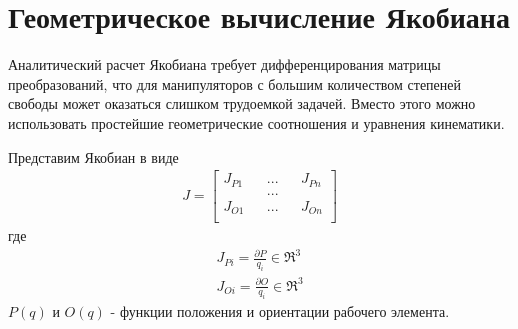 \section{Геометрическое вычисление Якобиана}\label{sect:4_8}
Аналитический расчет Якобиана требует дифференцирования матрицы преобразований, что для манипуляторов с большим количеством степеней свободы может оказаться слишком трудоемкой задачей. Вместо этого можно использовать простейшие геометрические соотношения и уравнения кинематики.

Представим Якобиан в виде
\begin{align*}
	J = \begin{bmatrix}
		J_{P1}		&&		...		&& 	J_{Pn}	\\
					&&		...		&& 			\\
		J_{O1}		&&		...		&&	J_{On}	\\
	\end{bmatrix}
\end{align*}
где
\begin{align*}
	J_{Pi} = \frac{\partial{P}}{q_{i}} 	\in \Re^{3}\\
	J_{Oi} = \frac{\partial{O}}{q_{i}}	\in	\Re^{3}
\end{align*}
$P(q)$ и $O(q)$ - функции положения и ориентации рабочего элемента.

